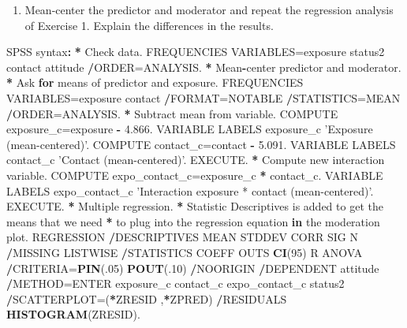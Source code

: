 \documentclass[a4paper]{book}
\newenvironment{Shaded}{\begin{snugshade}}{\end{snugshade}}
\newcommand{\KeywordTok}[1]{\textcolor[rgb]{0,0,0}{\textbf{#1}}}
\newcommand{\DecValTok}[1]{\textcolor[rgb]{0.00,0.00,0.00}{#1}}
\newcommand{\FloatTok}[1]{\textcolor[rgb]{0.00,0.00,0.00}{#1}}
\newcommand{\StringTok}[1]{\textcolor[rgb]{0.00,0.00,0.00}{#1}}
\newcommand{\ControlFlowTok}[1]{\textcolor[rgb]{0.00,0.00,0.00}{\textbf{#1}}}
\newcommand{\OperatorTok}[1]{\textcolor[rgb]{0.00,0.00,0.00}{\textbf{#1}}}
\newcommand{\ErrorTok}[1]{\textcolor[rgb]{0.00,0.00,0.00}{\textbf{#1}}}
\newcommand{\NormalTok}[1]{#1}
\providecommand{\tightlist}{%
  \setlength{\itemsep}{0pt}\setlength{\parskip}{0pt}}
\theoremstyle{definition}
\theoremstyle{definition}
\theoremstyle{definition}
\theoremstyle{remark}
\begin{document}
\begin{enumerate}
\def\labelenumi{\arabic{enumi}.}
\setcounter{enumi}{2}
\tightlist
\item
  Mean-center the predictor and moderator and repeat the regression
  analysis of Exercise 1. Explain the differences in the results.
\end{enumerate}

\begin{Shaded}
\begin{Highlighting}[]
\NormalTok{SPSS syntax}\OperatorTok{:}\StringTok{  }
\StringTok{  }
\ErrorTok{*}\StringTok{ }\NormalTok{Check data.  }
\NormalTok{FREQUENCIES VARIABLES=exposure status2 contact attitude  }
  \OperatorTok{/}\NormalTok{ORDER=ANALYSIS.  }
\OperatorTok{*}\StringTok{ }\NormalTok{Mean}\OperatorTok{-}\NormalTok{center predictor and moderator.  }
\OperatorTok{*}\StringTok{ }\NormalTok{Ask }\ControlFlowTok{for}\NormalTok{ means of predictor and exposure.  }
\NormalTok{FREQUENCIES VARIABLES=exposure contact  }
  \OperatorTok{/}\NormalTok{FORMAT=NOTABLE  }
  \OperatorTok{/}\NormalTok{STATISTICS=MEAN  }
  \OperatorTok{/}\NormalTok{ORDER=ANALYSIS.  }
\OperatorTok{*}\StringTok{ }\NormalTok{Subtract mean from variable.  }
\NormalTok{COMPUTE exposure_c=exposure }\OperatorTok{-}\StringTok{ }\FloatTok{4.866}\NormalTok{.  }
\NormalTok{VARIABLE LABELS  exposure_c }\StringTok{'Exposure (mean-centered)'}\NormalTok{.  }
\NormalTok{COMPUTE contact_c=contact }\OperatorTok{-}\StringTok{ }\FloatTok{5.091}\NormalTok{.  }
\NormalTok{VARIABLE LABELS  contact_c }\StringTok{'Contact (mean-centered)'}\NormalTok{.  }
\NormalTok{EXECUTE.  }
\OperatorTok{*}\StringTok{ }\NormalTok{Compute new interaction variable.  }
\NormalTok{COMPUTE expo_contact_c=exposure_c }\OperatorTok{*}\StringTok{ }\NormalTok{contact_c.  }
\NormalTok{VARIABLE LABELS  expo_contact_c }\StringTok{'Interaction exposure * contact  (mean-centered)'}\NormalTok{.  }
\NormalTok{EXECUTE.  }
\OperatorTok{*}\StringTok{ }\NormalTok{Multiple regression.  }
\OperatorTok{*}\StringTok{ }\NormalTok{Statistic Descriptives is added to get the means that we need  }
\OperatorTok{*}\StringTok{ }\NormalTok{to plug into the regression equation }\ControlFlowTok{in}\NormalTok{ the moderation plot.  }
\NormalTok{REGRESSION  }
  \OperatorTok{/}\NormalTok{DESCRIPTIVES MEAN STDDEV CORR SIG N  }
  \OperatorTok{/}\NormalTok{MISSING LISTWISE  }
  \OperatorTok{/}\NormalTok{STATISTICS COEFF OUTS }\KeywordTok{CI}\NormalTok{(}\DecValTok{95}\NormalTok{) R ANOVA  }
  \OperatorTok{/}\NormalTok{CRITERIA=}\KeywordTok{PIN}\NormalTok{(.}\DecValTok{05}\NormalTok{) }\KeywordTok{POUT}\NormalTok{(.}\DecValTok{10}\NormalTok{)  }
  \OperatorTok{/}\NormalTok{NOORIGIN   }
  \OperatorTok{/}\NormalTok{DEPENDENT attitude  }
  \OperatorTok{/}\NormalTok{METHOD=ENTER exposure_c contact_c expo_contact_c status2  }
  \OperatorTok{/}\NormalTok{SCATTERPLOT=(}\OperatorTok{*}\NormalTok{ZRESID ,}\OperatorTok{*}\NormalTok{ZPRED)  }
  \OperatorTok{/}\NormalTok{RESIDUALS }\KeywordTok{HISTOGRAM}\NormalTok{(ZRESID).  }
  

\end{Highlighting}
\end{Shaded}
\end{document}
